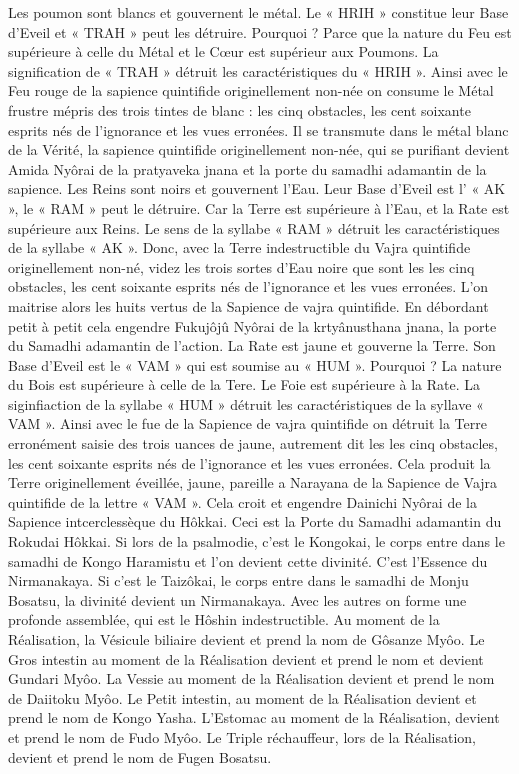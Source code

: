 Les poumon sont blancs et gouvernent le métal. Le « HRIH » constitue leur Base d'Eveil et « TRAH » peut les détruire. Pourquoi ? Parce que la nature du Feu est supérieure à celle du Métal et le Cœur est supérieur aux Poumons. La signification de « TRAH » détruit les caractéristiques du « HRIH ». Ainsi avec le Feu rouge de la sapience quintifide originellement non-née on consume le Métal frustre mépris des trois tintes de blanc : les cinq obstacles, les cent soixante esprits nés de l’ignorance et les vues erronées. Il se transmute dans le métal blanc de la Vérité, la sapience quintifide originellement non-née, qui se purifiant devient Amida Nyôrai de la pratyaveka jnana et la porte du samadhi adamantin de la sapience.
Les Reins sont noirs et gouvernent l’Eau. Leur Base d'Eveil est l’ « AK », le « RAM » peut le détruire. Car la Terre est supérieure à l’Eau, et la Rate est supérieure aux Reins. Le sens de la syllabe « RAM » détruit les caractéristiques de la syllabe « AK ». Donc, avec  la Terre indestructible du Vajra quintifide originellement non-né, videz les trois sortes d’Eau noire que sont les les cinq obstacles, les cent soixante esprits nés de l’ignorance et les vues erronées. L’on maitrise alors les huits vertus de la Sapience de vajra quintifide. En débordant petit à petit cela engendre Fukujôjû Nyôrai de la krtyânusthana jnana, la porte du Samadhi adamantin de l’action.
La Rate est jaune et gouverne la Terre. Son Base d'Eveil est le « VAM » qui est soumise au « HUM ». Pourquoi ? La nature du Bois est supérieure à celle de la Tere. Le Foie est supérieure à la Rate. La siginfiaction de la syllabe « HUM » détruit les caractéristiques de la syllave « VAM ». Ainsi avec le fue de la Sapience de vajra quintifide on détruit la Terre erronément saisie des trois uances de jaune, autrement dit les les cinq obstacles, les cent soixante esprits nés de l’ignorance et les vues erronées. Cela produit la Terre originellement éveillée, jaune, pareille a Narayana de la Sapience de Vajra quintifide de la lettre « VAM ». Cela croit et engendre Dainichi Nyôrai de la Sapience intcerclessèque du Hôkkai. Ceci est la Porte du  Samadhi adamantin du Rokudai Hôkkai.
Si lors de la psalmodie, c’est le Kongokai, le corps entre dans le samadhi de Kongo Haramistu et l’on devient cette divinité. C’est l’Essence du Nirmanakaya. Si c’est le Taizôkai, le corps entre dans le samadhi de Monju Bosatsu, la divinité devient un Nirmanakaya. Avec les autres on forme une profonde assemblée, qui est le Hôshin indestructible.
Au moment de la Réalisation, la Vésicule biliaire devient et prend la nom de Gôsanze Myôo. Le Gros intestin au moment de la Réalisation devient et prend le nom et devient Gundari Myôo. La Vessie au moment de la Réalisation devient et prend le nom de Daiitoku Myôo. Le Petit intestin, au  moment de la Réalisation devient et prend le nom de Kongo Yasha. L’Estomac au moment de la Réalisation, devient et prend le nom de Fudo Myôo.  Le Triple réchauffeur, lors de la Réalisation, devient et prend le nom de Fugen Bosatsu.
